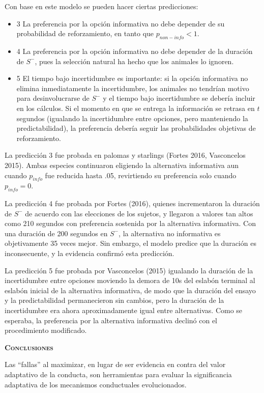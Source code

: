 \documentclass[a4paper,12pt]{article}
\begin{document}
Con base en este modelo se pueden hacer ciertas predicciones:
\begin{itemize}
	\item 3 La preferencia por la opción informativa no debe depender de su probabilidad de reforzamiento, en tanto que $p_{non-info} <1$.
	\item 4 La preferencia por la opción informativa no debe depender de la duración de $S^-$, pues la selección natural ha hecho que los animales lo ignoren.
	\item 5 El tiempo bajo incertidumbre es importante: si la opción informativa no elimina inmediatamente la incertidumbre, los animales no tendrían motivo para desinvolucrarse de $S^-$ y el tiempo bajo incertidumbre se debería incluir en los cálculos. Si el momento en que se entrega la información se retrasa en $t$ segundos (igualando la incertidumbre entre opciones, pero manteniendo la predictabilidad), la preferencia debería seguir las probabilidades objetivas de reforzamiento.
\end{itemize}

La predicción 3 fue probada en palomas y starlings (Fortes 2016, Vasconcelos 2015). Ambas especies continuaron eligiendo la alternativa informativa aun cuando $p_{info}$ fue reducida hasta .05, revirtiendo su preferencia solo cuando $p_{info}=0$.

La predicción 4 fue probada por Fortes (2016), quienes incrementaron la duración de $S^-$ de acuerdo con las elecciones de los sujetos, y llegaron a valores tan altos como 210 segundos con preferencia sostenida por la alternativa informativa. Con una duración de 200 segundos en $S^-$, la alternativa no informativa es objetivamente 35 veces mejor. Sin embargo, el modelo predice que la duración es inconsecuente, y la evidencia confirmó esta predicción.

La predicción 5 fue probada por Vasconcelos (2015) igualando la duración de la incertidumbre entre opciones moviendo la demora de 10s del eslabón terminal al eslabón inicial de la alternativa informativa, de modo que la duración del ensayo y la predictabilidad permanecieron sin cambios, pero la duración de la incertidumbre era ahora aproximadamente igual entre alternativas. Como se esperaba, la preferencia por la alternativa informativa declinó con el procedimiento modificado.

{\scshape\bfseries Conclusiones}

Las ``fallas'' al maximizar, en lugar de ser evidencia en contra del valor adaptativo de la conducta, son herramientas para evaluar la significancia adaptativa de los mecanismos conductuales evolucionados.
\end{document}

